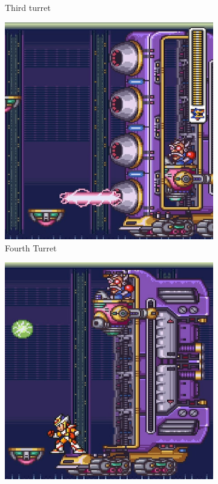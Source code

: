 \begin{figure}[htp]
\begin{subfigure}{.32\linewidth}
		\caption{Third turret}
	\end{subfigure}
	\begin{subfigure}{.32\linewidth}
		\centering
		\includegraphics[width=\linewidth]{figures/X2/Hunter_stages/Serges_tank_4.png}
		\caption{Fourth Turret}
	\end{subfigure}
	\begin{subfigure}{.32\linewidth}
		\centering
		\includegraphics[width=\linewidth]{figures/X2/Hunter_stages/Serges_tank_5.png}

\end{subfigure}
\end{figure}

